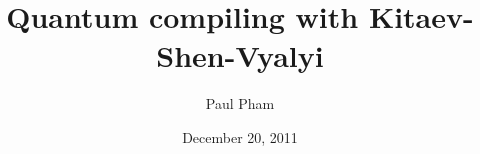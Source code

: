 \documentclass[twocolumn,10pt]{article}
\title{Quantum compiling with Kitaev-Shen-Vyalyi}
\date{December 20, 2011}
\author{Paul Pham}
\theoremstyle{plain}
\begin{document}
\newcommand{\braket}[2]{\langle #1|#2 \rangle}
\newcommand{\normtwo}{\frac{1}{\sqrt{2}}}
\newcommand{\norm}[1]{\parallel #1 \parallel}

\maketitle





















\end{document}
